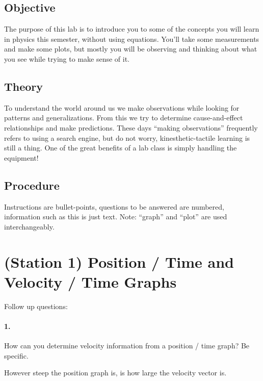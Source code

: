    \subsection*{Objective}

    The purpose of this lab is to introduce you to some of the concepts you will learn in physics this semester, without using equations. You’ll take some measurements and make some plots, but mostly you will be observing and thinking about what you see while trying to make sense of it. 

    \subsection*{Theory}

    To understand the world around us we make observations while looking for patterns and generalizations. From this we try to determine cause-and-effect relationships and make predictions. These days “making observations” frequently refers to using a search engine, but do not worry, kinesthetic-tactile learning is still a thing. One of the great benefits of a lab class is simply handling the equipment! 


    \subsection*{Procedure} 
    
    Instructions are bullet-points, questions to be answered are numbered, information such as this is just text. Note: “graph” and “plot” are used interchangeably.

    \pagebreak

    \section*{(Station 1) Position / Time and Velocity / Time Graphs}

    Follow up questions:

    \paragraph*{1.} How can you determine velocity information from a position / time graph? Be specific.

    \begin{mdframed}
        However steep the position graph is, is how large the velocity vector is.
    \end{mdframed}

